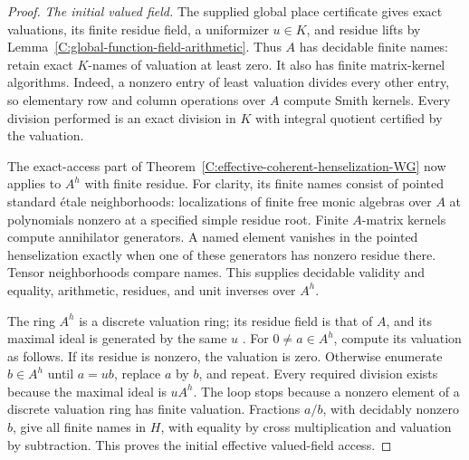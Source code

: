 \begin{proof}
\emph{The initial valued field.}
The supplied global place certificate gives
exact valuations, its finite residue field,
a uniformizer $u\in K$, and residue lifts
by Lemma~\ref{C:global-function-field-arithmetic}.
Thus $A$ has decidable finite names: retain
exact $K$-names of valuation at least zero.
It also has finite matrix-kernel algorithms.
Indeed, a nonzero entry of least valuation
divides every other entry, so elementary
row and column operations over $A$ compute
Smith kernels.  Every division performed
is an exact division in $K$ with integral
quotient certified by the valuation.

The exact-access part of
Theorem~\ref{C:effective-coherent-henselization-WG}
now applies to $A^h$ with finite residue.
For clarity, its finite names consist of
pointed standard \'{e}tale neighborhoods:
localizations of finite free monic algebras
over $A$ at polynomials nonzero at a
specified simple residue root.
Finite $A$-matrix kernels compute
annihilator generators.  A named element
vanishes in the pointed henselization
exactly when one of these generators
has nonzero residue there.
Tensor neighborhoods compare names.
This supplies decidable validity and
equality, arithmetic, residues, and
unit inverses over $A^h$.

The ring $A^h$ is a discrete valuation ring;
its residue field is that of $A$, and
its maximal ideal is generated by the
same $u$
\cite[Lemmas 15.46.1 and 15.46.11,
Tag 07QL]{C-StacksCoherentHenselizations}.
For $0\ne a\in A^h$, compute its
valuation as follows.  If its residue
is nonzero, the valuation is zero.
Otherwise enumerate $b\in A^h$ until
$a=ub$, replace $a$ by $b$, and repeat.
Every required division exists because
the maximal ideal is $uA^h$.
The loop stops because a nonzero element
of a discrete valuation ring has finite
valuation.  Fractions $a/b$, with
decidably nonzero $b$, give all finite
names in $H$, with equality by cross
multiplication and valuation by
subtraction.  This proves the initial
effective valued-field access.


\end{proof}
